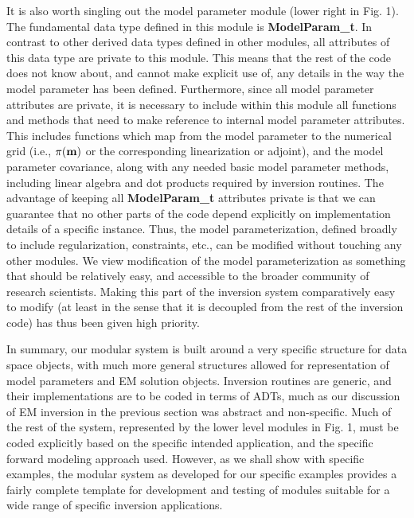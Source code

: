 It is also worth singling out the model parameter module
(lower right in Fig. 1).
The fundamental data type defined in this module is
{\bf ModelParam\_t}.  In contrast to other derived data
types defined in other modules, all attributes of this
data type are private to this module.  This means
that the rest of the
code does not know about, and cannot make explicit use of, any details in
the way the model parameter has been defined.  
Furthermore, since all model parameter attributes 
are private, it is necessary to include 
within this module all functions and methods that need to make reference
to internal model parameter attributes.
This includes functions which map from
the model parameter to the numerical grid (i.e., $\pi({\bf m})$ or
the corresponding linearization or adjoint), and the model
parameter covariance, along with any needed basic model parameter methods,
including linear algebra and dot products required by
inversion routines.  The advantage of
keeping all {\bf ModelParam\_t} attributes private is
that we can guarantee that no other parts of the code
depend explicitly on implementation details of a specific instance.
Thus, the model parameterization, defined broadly to
include regularization, constraints, etc., can be modified without
touching any other modules.  We view modification of
the model parameterization as something that should be
relatively easy, and accessible to the broader community of
research scientists.  Making this part of the inversion system
comparatively easy to modify (at least in the sense that it
is decoupled from the rest of the inversion code) has thus
been given high priority.

In summary, our modular system is built around a very specific
structure for data space objects, with much more general structures
allowed for representation of model parameters and EM solution
objects.  Inversion routines are generic, and their implementations
are to be coded in terms of ADTs, much as our discussion
of EM inversion in the previous section was abstract and
non-specific.  Much of the rest of the system, represented
by the lower level modules in Fig. 1, must be coded explicitly
based on the specific intended application, and the specific
forward modeling approach used.  However, as we shall show with
specific examples, the modular system as developed for our
specific examples provides a fairly complete template for development
and testing of modules suitable
for a wide range of specific inversion applications.
